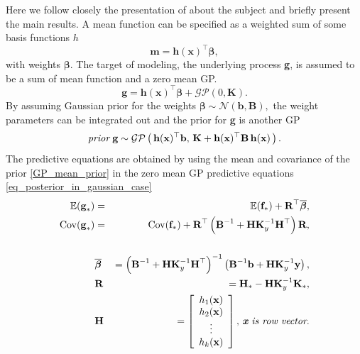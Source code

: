 \documentclass[twoside,11pt]{article}
\DeclareMathOperator{\COV}{Cov}
\begin{document}
Here we follow closely the presentation of
\citep{Rasmussen+Williams:2006} about the subject and briefly
present the main results. A mean function can be specified as a
weighted sum of some basis functions $h$
% 
\begin{equation}
  \textbf{m} = \textbf{h}(\textbf{x})^\top \boldsymbol{\beta},   \nonumber
\end{equation}
% 
with weights $\boldsymbol{\beta}$. The target of modeling, the underlying process \textbf{g}, is assumed to be a sum of mean function and a zero mean GP. 
% 
\begin{equation}
  \textbf{g} = \textbf{h}(\textbf{x})^\top \boldsymbol{\beta} + \mathcal{GP}(0,\textbf{K}).	\nonumber
\end{equation}
% 
By assuming Gaussian prior for the weights $\boldsymbol{\beta} \sim \mathcal{N}(\textbf{b},\textbf{B}),\nonumber$ the weight parameters can be integrated out and the prior for \textbf{g} is another GP
% 
\begin{equation}
  \label{GP_mean_prior}
  \emph{prior}\; \textbf{g} \sim \mathcal{GP}\left(\,\textbf{h}(\textbf{x})^\top \textbf{b},\,\textbf{K} + 
    \textbf{h}(\textbf{x})^\top \textbf{B}\,\textbf{h}(\textbf{x})\,\right). \nonumber
\end{equation}
% 
The predictive equations are obtained by using the mean and covariance of the prior \eqref{GP_mean_prior} in the zero mean GP predictive equations \eqref{eq_posterior_in_gaussian_case}
% 
\begin{eqnarray}
  \label{gp_mean_predE}
  \mathbb{E(\textbf{g}_*)} &=& \mathbb{E(\textbf{f}_*)} + \textbf{R}^\top \boldsymbol{\overline{\beta}},	\\
  \label{gp_mean_predV}\COV(\textbf{g}_*) &=& \COV(\textbf{f}_*) + \textbf{R}^\top\left( \textbf{B}^{-1} + 
    \textbf{H}\textbf{K}_{y}^{-1}\textbf{H}^\top \right)\textbf{R},	\\
  \nonumber\\
  &\boldsymbol{\overline{\beta}}& = 
  \left( \textbf{B}^{-1} + \textbf{H}\textbf{K}_y^{-1}\textbf{H}^\top \right)^{-1} 
  \left( \textbf{B}^{-1}\textbf{b} + \textbf{H}\textbf{K}_y^{-1}\textbf{y}\right), \nonumber\\
  &\textbf{R}& = \textbf{H}_* - \textbf{H}\textbf{K}_y^{-1}\textbf{K}_*,\nonumber\\
  &\textbf{H}& = 	\left[\begin{array}{c}
      h_1(\textbf{x})\\
      h_2(\textbf{x}) \\
      \vdots\\
      h_k(\textbf{x})
    \end{array}\right],\,  \textit{\textbf{x} is row vector}.\nonumber
\end{eqnarray}
\end{document}
